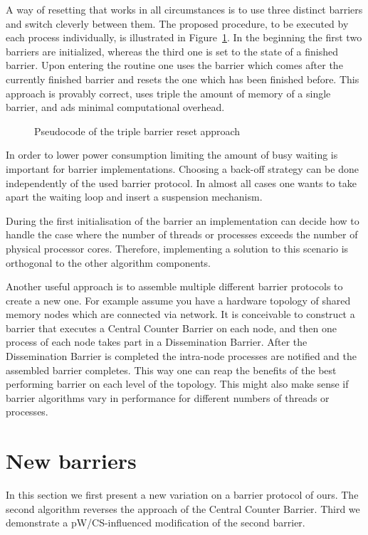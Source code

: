 \documentclass[a4paper, 10pt]{article}
\begin{document}
A way of resetting that works in all circumstances is to use three distinct barriers and switch cleverly between them. The proposed procedure, to be executed by each process individually, is illustrated in Figure~\ref{fig:pseudocode-triple-reset}. In the beginning the first two barriers are initialized, whereas the third one is set to the state of a finished barrier. Upon entering the routine one uses the barrier which comes after the currently finished barrier and resets the one which has been finished before. This approach is provably correct, uses triple the amount of memory of a single barrier, and ads minimal computational overhead.

\begin{figure}[htpb]
	\centering
	
	\caption{Pseudocode of the triple barrier reset approach}
	\label{fig:pseudocode-triple-reset}
\end{figure}

In order to lower power consumption limiting the amount of busy waiting is important for barrier implementations. Choosing a back-off strategy can be done independently of the used barrier protocol. In almost all cases one wants to take apart the waiting loop and insert a suspension mechanism.

During the first initialisation of the barrier an implementation can decide how to handle the case where the number of threads or processes exceeds the number of physical processor cores. Therefore, implementing a solution to this scenario is orthogonal to the other algorithm components.

Another useful approach is to assemble multiple different barrier protocols to create a new one. For example assume you have a hardware topology of shared memory nodes which are connected via network. It is conceivable to construct a barrier that executes a Central Counter Barrier on each node, and then one process of each node takes part in a Dissemination Barrier. After the Dissemination Barrier is completed the intra-node processes are notified and the assembled barrier completes.
This way one can reap the benefits of the best performing barrier on each level of the topology.
This might also make sense if barrier algorithms vary in performance for different numbers of threads or processes.

\section{New barriers}
\label{sec:new}
In this section we first present a new variation on a barrier protocol of ours. The second algorithm reverses the approach of the Central Counter Barrier. Third we demonstrate a pW/CS-influenced modification of the second barrier.
\end{document}
